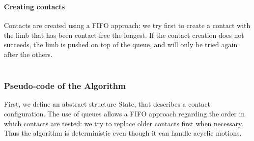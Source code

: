 \documentclass[journal]{IEEEtran}
\newcommand{\deladp}[1]{\deleted[id=adp]{#1}}
\providecommand{\DIFaddtex}[1]{#1} %
\providecommand{\DIFdeltex}[1]{} %
\providecommand{\DIFaddbegin}{\protect\color{blue}} %
\providecommand{\DIFaddend}{\protect\color{black}} %
\providecommand{\DIFdelbegin}{\protect\cbdelete} %
\providecommand{\DIFdelend}{} %
\providecommand{\DIFadd}[1]{\texorpdfstring{\DIFaddtex{#1}}{#1}} %
\providecommand{\DIFdel}[1]{\texorpdfstring{\DIFdeltex{#1}}{}} %
\begin{document}
\DIFdelbegin \subsubsection{\DIFdel{Creating contacts}}
\addtocounter{subsubsection}{-1}%
\DIFdelend \DIFaddbegin \paragraph{\DIFadd{Creating contacts}}
\DIFaddend Contacts are created using a FIFO approach: we try first to create a contact with the limb that has been contact-free the longest. If the contact creation does not succeeds, the limb is pushed on top of the queue, and will only be tried again after the others. \DIFaddbegin \\ \\
\DIFaddend %



\DIFaddbegin \subsubsection{\DIFadd{Pseudo-code of the Algorithm}}
\label{app:contact}


\DIFadd{First, we define an abstract structure State,
that describes a contact configuration.
The use of queues allows a FIFO approach regarding the order 
in which contacts are tested: we try to replace older contacts first when necessary.
Thus the algorithm is deterministic even though it can handle acyclic motions. }\\
\end{document}
